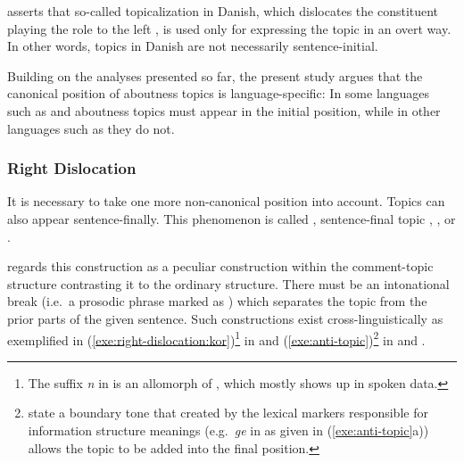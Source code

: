 \noindent \citeauthor{erteschik:07} asserts that so-called
topicalization in Danish, which dislocates the constituent playing
the  role to the left , is used only for expressing the
topic in an overt way.  In other words, topics in Danish are not
necessarily sentence-initial.




Building on the analyses presented so far, the present study argues
that the canonical position of aboutness topics is language-specific:
In some languages such as  and  aboutness topics must
appear in the initial position, while in other languages such as
 they do not.






























\subsubsection{Right Dislocation}
\label{4:sssec:right-dislocation}

It is necessary to take one more non-canonical  position into
account. Topics can also appear sentence-finally. This phenomenon is
called  \citep{cecchetto:99,law:03}, sentence-final
topic \citep{fery:krifka:08}, 
\citep{chafe:76,lambrecht:96}, or  \citep{kim:11}.


  


\noindent \citet{gundel:88} regards this construction as a peculiar
construction within the comment-topic structure contrasting it to the
ordinary  structure.  There must be an intonational break
(i.e.\ a prosodic phrase marked as ) which separates the
topic from the prior parts of the given sentence. Such constructions
exist cross-linguistically as exemplified in
(\ref{exe:right-dislocation:kor})\footnote{The suffix \textit{n} in
   is an allomorph of \nun, which
  mostly shows up in spoken data.} in  and
(\ref{exe:anti-topic})\footnote{\citet{fery:krifka:08} state a
  boundary tone that created by the lexical markers responsible for
  information structure meanings (e.g.\ \textit{ge} in 
  as given in (\ref{exe:anti-topic}a)) allows the topic to be added
  into the final position.} in  and
.


